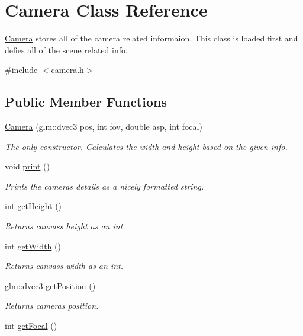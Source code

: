 \hypertarget{class_camera}{}\section{Camera Class Reference}
\label{class_camera}


\mbox{\hyperlink{class_camera}{Camera}} stores all of the camera related informaion. This class is loaded first and defies all of the scene related info.  




{\ttfamily \#include $<$camera.\+h$>$}

\subsection*{Public Member Functions}
\begin{DoxyCompactItemize}
\item 
\mbox{\hyperlink{class_camera_a9b4b8e1957b7e177a5d1a049c11f053f}{Camera}} (glm\+::dvec3 pos, int fov, double asp, int focal)
\begin{DoxyCompactList}\small\item\em The only constructor. Calculates the width and height based on the given info. \end{DoxyCompactList}\item 
void \mbox{\hyperlink{class_camera_a905d2a0f8677aaad1ee17eb2a842efe5}{print}} ()
\begin{DoxyCompactList}\small\item\em Prints the camera\textquotesingle{}s details as a nicely formatted string. \end{DoxyCompactList}\item 
int \mbox{\hyperlink{class_camera_a315be9ee1238abddce9a580430ad403a}{get\+Height}} ()
\begin{DoxyCompactList}\small\item\em Returns canvas\textquotesingle{}s height as an int. \end{DoxyCompactList}\item 
int \mbox{\hyperlink{class_camera_a1122b43b7db5e69e9d6e187b74a6ec7e}{get\+Width}} ()
\begin{DoxyCompactList}\small\item\em Returns canvas\textquotesingle{}s width as an int. \end{DoxyCompactList}\item 
glm\+::dvec3 \mbox{\hyperlink{class_camera_a4ea62b0ec351ac3cf4bd228617a3ec54}{get\+Position}} ()
\begin{DoxyCompactList}\small\item\em Returns camera\textquotesingle{}s position. \end{DoxyCompactList}\item 
int \mbox{\hyperlink{class_camera_a5045b4557d3cd7cd4c64c49f5a693aa5}{get\+Focal}} ()
\end{DoxyCompactItemize}


